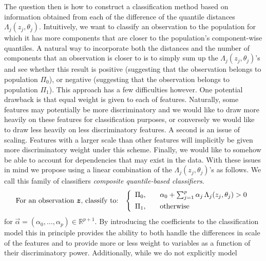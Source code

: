 The question then is how to construct a classification method based on
information obtained from each of the difference of the quantile distances
$\Lambda_j(z_j, \theta_j)$.  Intuitively, we want to classify an observation to
the population for which it has more components that are closer to the
population's component-wise quantiles.  A natural way to incorporate both the
distances and the number of components that an observation is closer to is to
simply sum up the $\Lambda_j(z_j, \theta_j)$'s and see whether this result is
positive (suggesting that the observation belongs to population $\Pi_0$), or
negative (suggesting that the observation belongs to population $\Pi_1$).  This
approach has a few difficulties however.  One potential drawback is that equal
weight is given to each of features.  Naturally, some features may potentially
be more discriminatory and we would like to draw more heavily on these features
for classification purposes, or conversely we would like to draw less heavily on
less discriminatory features.  A second is an issue of scaling.  Features with a
larger scale than other features will implicitly be given more discriminatory
weight under this scheme.  Finally, we would like to somehow be able to account
for dependencies that may exist in the data.  With these issues in mind we
propose using a linear combination of the $\Lambda_j(z_j, \theta_j)$'s as
follows.  We call this family of classifiers \emph{composite quantile-based
  classifiers}.
\begin{equation}
  \label{eq:composite-classifier}
  \text{For an observation $\vec{z}$, classify to:} \hspace{3mm}
  \left\{
    \begin{array}{lll}
      \Pi_0, & & %
                 \alpha_0 + \sum_{j=1}^p \alpha_j \,
                 \Lambda_j (z_j, \theta_j) > 0 \\[1ex]
      \Pi_1, & & \text{otherwise}
    \end{array}
  \right.
\end{equation}
for $\vec{\alpha} = (\alpha_0, \dots, \alpha_p) \in \mathbb{R}^{p+1}$.  By
introducing the coefficients to the classification model this in principle
provides the ability to both handle the differences in scale of the features and
to provide more or less weight to variables as a function of their
discriminatory power. Additionally, while we do not explicitly model
